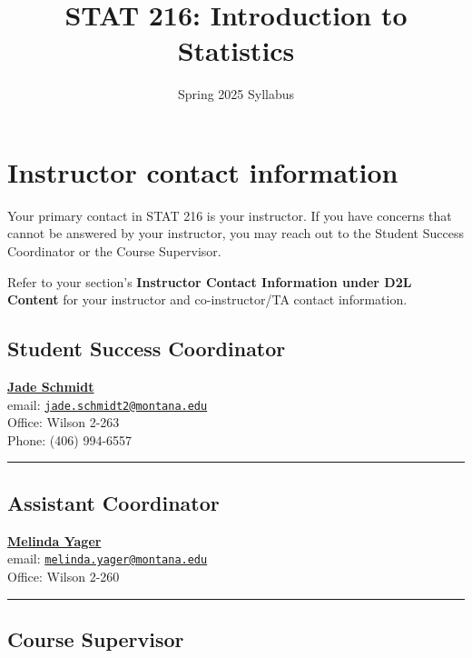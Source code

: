 \documentclass[
]{article}
\title{STAT 216: Introduction to Statistics}
\author{Spring 2025 Syllabus}
\date{}
\begin{document}
\maketitle

{
\setcounter{tocdepth}{3}
\tableofcontents
}
\section{Instructor contact
information}\label{instructor-contact-information}

Your primary contact in STAT 216 is your instructor. If you have
concerns that cannot be answered by your instructor, you may reach out
to the Student Success Coordinator or the Course Supervisor.

Refer to your section's \textbf{Instructor Contact Information under D2L
Content} for your instructor and co-instructor/TA contact information.

\subsection{Student Success
Coordinator}\label{student-success-coordinator}

\href{http://www.math.montana.edu/directory/faculty/1524571/jade-schmidt}{\textbf{Jade
Schmidt}}\\
email:
\href{mailto:jade.schmidt2@montana.edu}{\nolinkurl{jade.schmidt2@montana.edu}}\\
Office: Wilson 2-263\\
Phone: (406) 994-6557

\begin{center}\rule{0.5\linewidth}{0.5pt}\end{center}

\subsection{Assistant Coordinator}\label{assistant-coordinator}

\href{http://www.math.montana.edu/directory/faculty/1582830/melinda-yager}{\textbf{Melinda
Yager}}\\
email:
\href{mailto:melinda.yager@montana.edu}{\nolinkurl{melinda.yager@montana.edu}}\\
Office: Wilson 2-260

\begin{center}\rule{0.5\linewidth}{0.5pt}\end{center}

\subsection{Course Supervisor}\label{course-supervisor}
\end{document}
